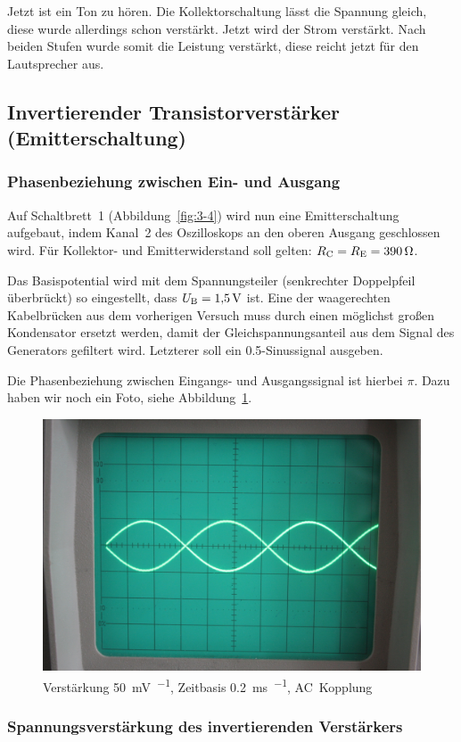 Jetzt ist ein Ton zu hören. Die Kollektorschaltung lässt die Spannung gleich,
diese wurde allerdings schon verstärkt. Jetzt wird der Strom verstärkt. Nach
beiden Stufen wurde somit die Leistung verstärkt, diese reicht jetzt für den
Lautsprecher aus.

\FloatBarrier
\subsection{Invertierender Transistorverstärker (Emitterschaltung)}

\FloatBarrier
\subsubsection{Phasenbeziehung zwischen Ein- und Ausgang}

Auf Schaltbrett~1 (Abbildung~\ref{fig:3-4}) wird nun eine Emitterschaltung
aufgebaut, indem Kanal~2 des Oszilloskops an den oberen Ausgang geschlossen
wird. Für Kollektor- und Emitterwiderstand soll gelten: $R_\text{C} = R_\text{E} =
\SI{390}{\ohm}$.

Das Basispotential wird mit dem Spannungsteiler (senkrechter Doppelpfeil
überbrückt) so eingestellt, dass $U_\text{B} = \SI{1.5}{\volt}$ ist. Eine der
waagerechten Kabelbrücken aus dem vorherigen Versuch muss durch einen möglichst
großen Kondensator ersetzt werden, damit der Gleichspannungsanteil aus dem
Signal des Generators gefiltert wird. Letzterer soll ein
\SI{0.5}{\voltss}-Sinussignal ausgeben.

Die Phasenbeziehung zwischen Eingangs- und Ausgangssignal ist hierbei $\pi$.
Dazu haben wir noch ein Foto, siehe Abbildung~\ref{fig:799}.

\begin{figure}[htbp]
	\centering
	\includegraphics[width=.45\linewidth]{Oszi_Foto/4-799.jpg}
	\caption{%
		Verstärkung \SI{50}{\milli\volt\per\division},
		Zeitbasis \SI{.2}{\milli\second\per\division},
		AC~Kopplung
	}
	\label{fig:799}
\end{figure}

\FloatBarrier
\subsubsection{Spannungsverstärkung des invertierenden Verstärkers}

